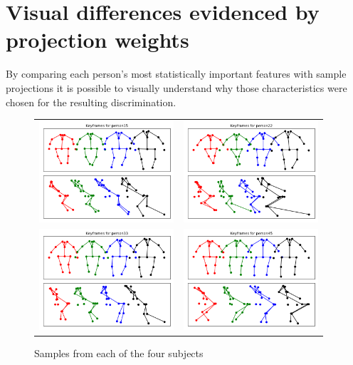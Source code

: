 \documentclass{bmvc2k}
\begin{document}
\section{Visual differences evidenced by projection weights}
By comparing each person's most statistically important features with sample projections it is possible to visually understand why those characteristics were chosen for the resulting discrimination.

\begin{figure}[H]
   \begin{center}
      \begin{tabular}{c c}
         \includegraphics[width=5cm]{figures/walkdata.png}&\includegraphics[width=5cm]{figures/walkdatap2.png}\\
         \includegraphics[width=5cm]{figures/walkdatap3.png}&\includegraphics[width=5cm]{figures/walkdatap4.png}
      \end{tabular}
      \caption{Samples from each of the four subjects}
   \end{center}
\end{figure}
\end{document}
